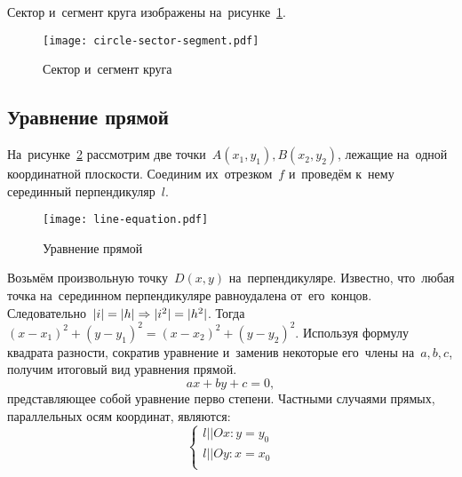 \documentclass[]{scrartcl}
\begin{document}
Сектор и~сегмент круга изображены на~рисунке~\ref{fig:circle-sector-segment}.

\begin{figure}[ht]
	\centering %
	\texttt{[image: circle-sector-segment.pdf]}
	\caption{Сектор и~сегмент круга}\label{fig:circle-sector-segment}
\end{figure}


\subsection{Уравнение прямой}
На~рисунке~\ref{fig:line-equation} рассмотрим две точки~${\textstyle A(x_{1},y_{1}),B(x_{2},y_{2})}$, лежащие на~одной координатной плоскости. Соединим их~отрезком~${\textstyle f}$ и~проведём к~нему серединный перпендикуляр~${\textstyle l}$.
\begin{figure}[ht]
	\centering %
	\texttt{[image: line-equation.pdf]}
	\caption{Уравнение прямой}\label{fig:line-equation}
\end{figure}
Возьмём произвольную точку~${\textstyle D(x,y)}$ на~перпендикуляре. Известно, что~любая точка на~серединном перпендикуляре равноудалена от~его~концов. Следовательно~${\textstyle \arrowvert i \arrowvert=\arrowvert h \arrowvert \Rightarrow \arrowvert i^2 \arrowvert=\arrowvert h^2 \arrowvert}$. Тогда~${\textstyle (x-x_{1})^2+(y-y_1)^2=(x-x_{2})^2+(y-y_2)^2}$. Используя формулу квадрата разности, сократив уравнение и~заменив некоторые его~члены на~${\textstyle a,b,c}$, получим итоговый вид уравнения прямой.
\begin{equation}\label{eq:line-equation}
ax+by+c=0,
\end{equation}
представляющее собой уравнение перво степени. Частными случаями прямых, параллельных осям координат, являются:
\begin{equation}\label{eq:parallel-line-equations}
\begin{cases}
l||Ox:y=y_0\\
l||Oy:x=x_0\\
\end{cases}
\end{equation}
\end{document}
